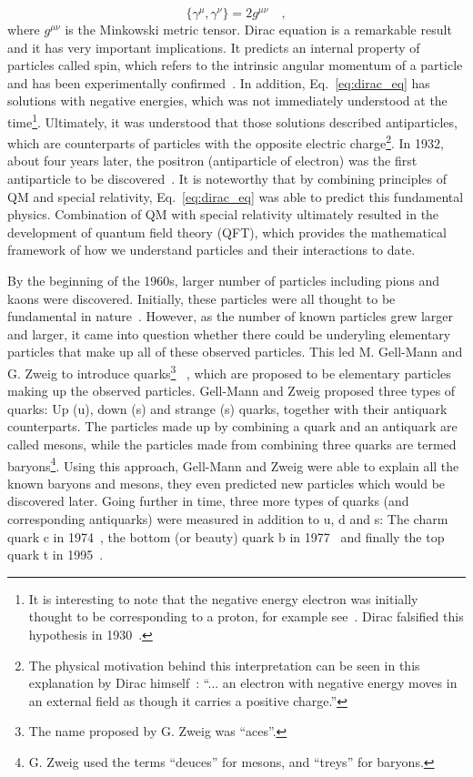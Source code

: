 \begin{equation}
    \{\gamma^{\mu}, \gamma^{\nu} \} = 2g^{\mu\nu} \quad ,
    \label{eq:gamma_matrices_anticomm}
\end{equation}
where $g^{\mu\nu}$ is the Minkowski metric tensor.
Dirac equation is a remarkable result and it has very important implications.
It predicts an internal property of particles called spin, 
which refers to the intrinsic angular momentum of a particle and has been
experimentally confirmed~\cite{Dirac:1928hu}. In addition, Eq.~\ref{eq:dirac_eq} has solutions with negative
energies, which was not immediately understood at the time\footnote{It is interesting to note
that the negative energy electron was initially thought to be corresponding to a proton,
for example see~\cite{Weyl:1929fm}. Dirac falsified this hypothesis
in 1930~\cite{Dirac:1930ek}.}. 
Ultimately, it was understood that those solutions described
antiparticles, which are counterparts of particles with the opposite electric 
charge\footnote{The physical motivation behind this interpretation can be seen 
in this explanation by Dirac himself~\cite{Dirac:1930ek}: 
``... an electron with negative energy moves in an external
field as though it carries a positive charge.''}. 
In 1932, about four years later, the positron (antiparticle of electron) 
was the first antiparticle to be discovered~\cite{Anderson:1932zz}. 
It is noteworthy that by combining principles of QM and special relativity,
Eq.~\ref{eq:dirac_eq} was able to predict this fundamental physics.
Combination of QM with special relativity ultimately resulted in the development of 
quantum field theory (QFT), which provides the mathematical framework 
of how we understand particles and their interactions to date.

By the beginning of the 1960s, larger number of particles including
pions and kaons were discovered. Initially, these particles were all thought to 
be fundamental in nature~\cite{Riordan:1992hr}. 
However, as the number of known particles grew larger and larger, it came into 
question whether there could be
underyling elementary particles that make up all of these observed particles. This led 
M. Gell-Mann and G. Zweig to introduce 
quarks\footnote{The name proposed by G. Zweig was ``aces''.}
~\cite{Gell-Mann:1964ewy, Zweig:1964ruk}, which are proposed to
be elementary particles making up the observed particles. Gell-Mann and Zweig proposed 
three types of quarks:
Up (u), down (s) and strange (s) quarks, together with their antiquark counterparts.
The particles made up by combining a quark and an antiquark are called mesons, while the particles made
from combining three quarks are termed 
baryons\footnote{G. Zweig used the terms ``deuces'' for mesons, and ``treys'' for baryons.}. 
Using this approach, Gell-Mann and Zweig were able to
explain all the known baryons and mesons, they even predicted new particles which would be discovered 
later\cite{Riordan:1992hr}. Going further in time, three more types of quarks (and corresponding 
antiquarks) were measured in addition to u, d and s: The charm quark c in 1974~\cite{E598:1974sol}, the
bottom (or beauty) quark b in 1977~\cite{E288:1977xhf} and finally the top quark t in 1995~\cite{D0:1995jca}.

